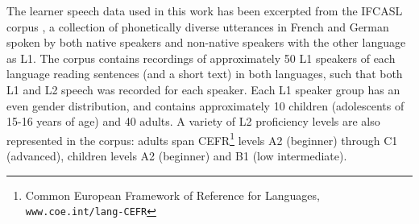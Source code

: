 \documentclass[a4paper]{article}
\newcommand{\TODO}[1]{{\color{red}\textbf{[TODO #1]}}}
\begin{document}
		The learner speech data used in this work has been excerpted from the IFCASL corpus 
		\cite{Fauth2014}, a collection of 
	phonetically diverse utterances in French and German spoken by both native speakers and non-native speakers with the other language as L1. 
	The corpus contains recordings of approximately 50 L1 speakers of each language reading 
	sentences (and a short text) in both languages, such that both L1 and L2 speech was recorded for each speaker. Each L1 speaker group has an even gender distribution, and contains approximately 10 children (adolescents of 15-16 years of age) and 40 adults. A variety of L2 proficiency levels are also represented in the corpus: adults span CEFR\footnote{Common European Framework of Reference for Languages, \texttt{www.coe.int/lang-CEFR}} levels A2 (beginner) through C1 (advanced), children levels A2 (beginner) and B1 (low intermediate).
	
\end{document}
